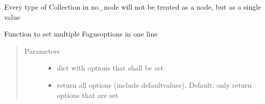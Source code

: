 \documentclass[a4paper,10pt,english]{sphinxmanual}
\begin{document}
\begin{fulllineitems}

\begin{fulllineitems}
\label{\detokenize{fagus.utils:fagus.utils.FagusMeta.no_node}}
\pysigstartsignatures
{}
\pysigstopsignatures
\sphinxAtStartPar
Every type of Collection in no\_node will not be treated as a node, but as a single value

\end{fulllineitems}


\begin{fulllineitems}
\label{\detokenize{fagus.utils:fagus.utils.FagusMeta.options}}
\pysigstartsignatures
{}
\pysigstopsignatures
\sphinxAtStartPar
Function to set multiple Fagus\sphinxhyphen{}options in one line
\begin{quote}\begin{description}
\item[{Parameters}] \leavevmode\begin{itemize}
\item {}
\sphinxAtStartPar
{} \textendash{} dict with options that shall be set

\item {}
\sphinxAtStartPar
{} \textendash{} return all options (include default\sphinxhyphen{}values). Default: only return options that are set


\end{itemize}
\end{description}
\end{quote}
\end{fulllineitems}
\end{fulllineitems}
\end{document}
